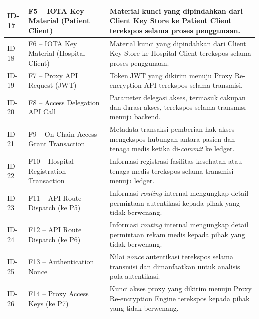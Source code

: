 \begin{xltabular}{\textwidth}{|>{\centering\arraybackslash}p{1.8cm}|>{\raggedright\arraybackslash}p{3.2cm}|X|}
    ID-17 &
    F5 -- IOTA Key Material (Patient Client) &
    Material kunci yang dipindahkan dari Client Key Store ke Patient Client terekspos selama proses penggunaan. \\
    \hline

    ID-18 &
    F6 -- IOTA Key Material (Hospital Client) &
    Material kunci yang dipindahkan dari Client Key Store ke Hospital Client terekspos selama proses penggunaan. \\
    \hline

    ID-19 &
    F7 -- Proxy API Request (JWT) &
    Token JWT yang dikirim menuju Proxy Re-encryption API terekspos selama transmisi. \\
    \hline

    ID-20 &
    F8 -- Access Delegation API Call &
    Parameter delegasi akses, termasuk cakupan dan durasi akses, terekspos selama transmisi menuju backend. \\
    \hline

    ID-21 &
    F9 -- On-Chain Access Grant Transaction &
    Metadata transaksi pemberian hak akses mengekspos hubungan antara pasien dan tenaga medis ketika di-\textit{commit} ke ledger. \\
    \hline

    ID-22 &
    F10 -- Hospital Registration Transaction &
    Informasi registrasi fasilitas kesehatan atau tenaga medis terekspos selama transmisi menuju ledger. \\
    \hline

    ID-23 &
    F11 -- API Route Dispatch (ke P5) &
    Informasi \textit{routing} internal mengungkap detail permintaan autentikasi kepada pihak yang tidak berwenang. \\
    \hline

    ID-24 &
    F12 -- API Route Dispatch (ke P6) &
    Informasi \textit{routing} internal mengungkap detail permintaan rekam medis kepada pihak yang tidak berwenang. \\
    \hline

    ID-25 &
    F13 -- Authentication Nonce &
    Nilai \textit{nonce} autentikasi terekspos selama transmisi dan dimanfaatkan untuk analisis pola autentikasi. \\
    \hline

    ID-26 &
    F14 -- Proxy Access Keys (ke P7) &
    Kunci akses proxy yang dikirim menuju Proxy Re-encryption Engine terekspos kepada pihak yang tidak berwenang. \\
    \hline


\end{xltabular}
